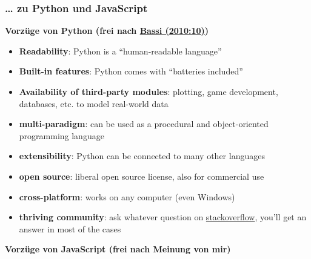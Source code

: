 \subsubsection{\texorpdfstring{{\ldots{} zu Python und
JavaScript}}{\ldots{} zu Python und JavaScript}}

\vspace{0.5cm}\par\noindent\textbf{Vorzüge von Python (frei nach\vspace{0.5cm}
\href{http://bibliography.lingpy.org?key=Bassi2010}{Bassi (2010:10)})}

\begin{itemize}
\itemsep1pt\parskip0pt
\item
  \textbf{Readability}: Python is a ``human-readable language''
\item
  \textbf{Built-in features}: Python comes with ``batteries included''
\item
  \textbf{Availability of third-party modules}: plotting, game
  development, databases, etc. to model real-world data
\item
  \textbf{multi-paradigm}: can be used as a procedural and
  object-oriented programming language
\item
  \textbf{extensibility}: Python can be connected to many other
  languages
\item
  \textbf{open source}: liberal open source license, also for commercial
  use
\item
  \textbf{cross-platform}: works on any computer (even Windows)
\item
  \textbf{thriving community}: ask whatever question on
  \href{http://stackoverflow.com}{stackoverflow}, you'll get an answer
  in most of the cases
\end{itemize}



\vspace{0.5cm}\par\noindent\textbf{Vorzüge von JavaScript (frei nach Meinung von mir)}\vspace{0.5cm}

